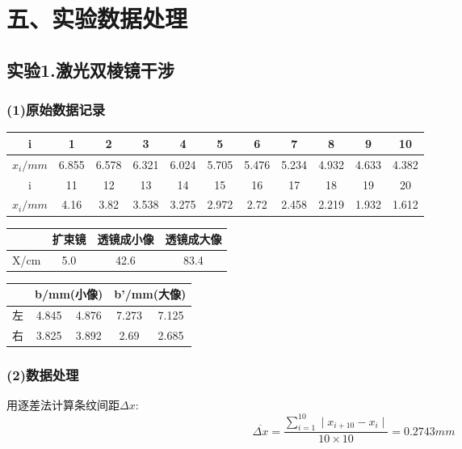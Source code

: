\documentclass[11pt,a4paper,oneside]{article}
\begin{document}
\section*{五、实验数据处理}
\subsection*{实验1.激光双棱镜干涉}
\subsubsection*{(1)原始数据记录}

\begin{center}
\begin{table}[htbp]
\begin{tabular}{|c|c|c|c|c|c|c|c|c|c|c|}
\hline
i & 1 & 2 & 3 & 4 & 5 & 6 & 7 & 8 & 9 & 10
\\
\hline
$x_i/mm$
&6.855&6.578&6.321&6.024&5.705&5.476&5.234&4.932&4.633&4.382
\\
\hline
i & 11 & 12 & 13 & 14 & 15 & 16 & 17 & 18 & 19 & 20
\\
\hline
$x_i/mm$
&4.16&3.82&3.538&3.275&2.972&2.72&2.458&2.219&1.932&1.612
\\
\hline
\end{tabular}
\end{table}
\begin{table}[htbp]
\begin{tabular}{|c|c|c|c|}
\hline
   & 扩束镜 & 透镜成小像 & 透镜成大像 \\
\hline
X/cm
&5.0
&42.6
&83.4

\\
\hline
\end{tabular}
\end{table}
\begin{table}[htbp]
\begin{tabular}{|c|c|c|c|c|}
\hline
 & \multicolumn{2}{|c|}{b/mm(小像) }& \multicolumn{2}{|c|}{b'/mm(大像)} \\
\hline
左 & 4.845 &4.876 & 7.273 & 7.125 \\
\hline
右 & 3.825 &3.892 & 2.69 & 2.685 \\
\hline
\end{tabular}
\end{table}
\end{center}

\subsubsection*{(2)数据处理}
用逐差法计算条纹间距${\Delta}x$:
$$\overline{{\Delta}x} = \displaystyle\frac{\sum\limits_{i=1}^{10}{\mid}x_{i+10}-x_i{\mid}}{10{\times}10} = 0.2743mm$$
\end{document}

